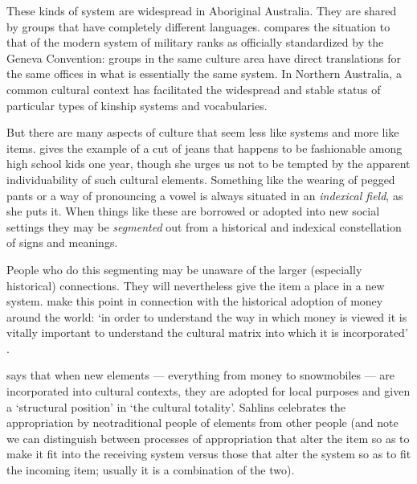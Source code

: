 These kinds of system are widespread in Aboriginal Australia. They are shared by 
groups that have completely different languages. \citet{evans_enigma_2012} compares the 
situation to that of the modern system of military ranks as officially 
standardized by the Geneva Convention: groups in the same culture area have direct translations for the same offices in what is essentially the same system. In Northern Australia, a common cultural context has 
facilitated the widespread and stable status of particular types of 
kinship systems and vocabularies. 



But there are many aspects of culture that seem less 
like systems and more like items. \citet{eckert_variation_2008} gives the example of a cut of 
jeans that happens to be fashionable among high school kids one year, though she urges us not to be tempted by the apparent individuability of 
such cultural elements. Something like the wearing of pegged pants or a 
way of pronouncing a vowel is always situated in an \textit{indexical 
field}, as she puts it. When things like these are borrowed or adopted into new 
social settings they may be \textit{segmented} out from a historical and 
indexical constellation of signs and meanings. 



People who do this segmenting may be unaware of the larger (especially 
historical) connections. They will nevertheless give the item a 
place in a new system. \citet{parry_money_1989} make this point in connection with the historical adoption of money around the world: \textquoteleft in 
order to understand the way in which money is viewed it is vitally 
important to understand the cultural matrix into which it is 
incorporated' \citep[1]{parry_money_1989}.



\citet{sahlins_what_1999} says that when new elements --- everything from 
money to snowmobiles --- are incorporated into cultural contexts, they are 
adopted for local purposes and given a \textquoteleft structural position' in \textquoteleft the 
cultural totality'. Sahlins celebrates the appropriation 
by neotraditional people of elements from other people 
(and note we can distinguish between processes of appropriation that 
alter the item so as to make it fit into the receiving system versus 
those that alter the system so as to fit the incoming item; usually it is a combination of the two). 




